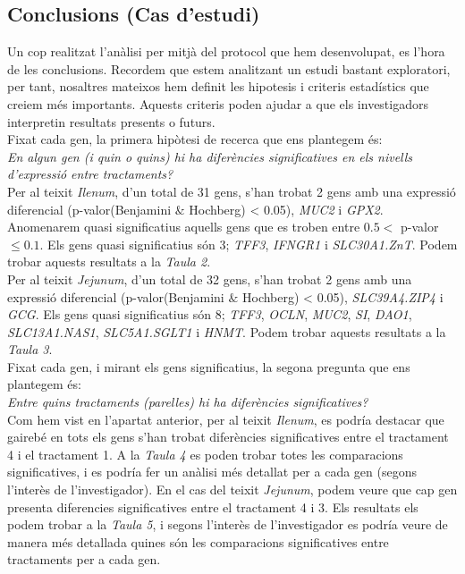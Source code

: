 \documentclass[english]{article}
\begin{document}
\subsection{Conclusions (Cas d'estudi)}

Un cop realitzat l'anàlisi per mitjà del protocol que hem desenvolupat, es l'hora de les conclusions. Recordem que estem analitzant un estudi bastant exploratori, per tant, nosaltres mateixos hem definit les hipotesis i criteris estadístics que creiem més importants. Aquests criteris poden ajudar a que els investigadors interpretin resultats presents o futurs.
\\

Fixat cada gen, la primera hipòtesi de recerca que ens plantegem és:
\\

\textit{En algun gen (i quin o quins) hi ha diferències significatives en els nivells d'expressió entre tractaments?}
\\

Per al teixit \textit{Ilenum}, d'un total de 31 gens, s'han trobat 2 gens amb una expressió diferencial (p-valor(Benjamini $\&$ Hochberg) < 0.05), \textit{MUC2} i \textit{GPX2}. Anomenarem quasi significatius aquells gens que es troben entre $0.5 <$ p-valor $\leq 0.1$. Els gens quasi significatius són 3; \textit{TFF3}, \textit{IFNGR1} i \textit{SLC30A1.ZnT}. Podem trobar aquests resultats a la \textit{Taula 2}.
\\

Per al teixit \textit{Jejunum}, d'un total de 32 gens, s'han trobat 2 gens amb una expressió diferencial (p-valor(Benjamini $\&$ Hochberg) < 0.05), \textit{SLC39A4.ZIP4} i \textit{GCG}. Els gens quasi significatius són 8; \textit{TFF3}, \textit{OCLN}, \textit{MUC2}, \textit{SI}, \textit{DAO1}, \textit{SLC13A1.NAS1}, \textit{SLC5A1.SGLT1} i \textit{HNMT}. Podem trobar aquests resultats a la \textit{Taula 3}.\\

Fixat cada gen, i mirant els gens significatius, la segona pregunta que ens plantegem és:
\\

\textit{Entre quins tractaments (parelles) hi ha diferències significatives?}
\\

Com hem vist en l'apartat anterior, per al teixit \textit{Ilenum}, es podría destacar que gairebé en tots els gens s'han trobat diferències significatives entre el tractament 4 i el tractament 1. A la \emph{Taula 4} es poden trobar totes les comparacions significatives, i es podría fer un anàlisi més detallat per a cada gen (segons l'interès de l'investigador). En el cas del teixit \textit{Jejunum}, podem veure que cap gen presenta diferencies significatives entre el tractament 4 i 3. Els resultats els podem trobar a la \textit{Taula 5}, i segons l'interès de l'investigador es podría veure de manera més detallada quines són les comparacions significatives entre tractaments per a cada gen.
\\
\end{document}
